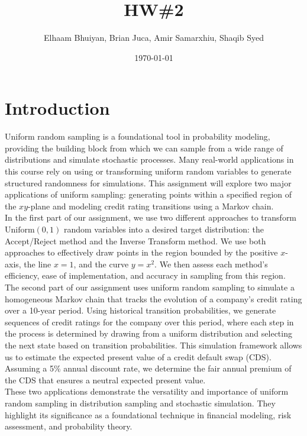 \documentclass{report}
\title{HW\#2}
\author{
Elhaam Bhuiyan,
Brian Juca,
Amir Samarxhiu,
Shaqib Syed
}
\date{\today}
\begin{document}
\maketitle
\section*{Introduction}
Uniform random sampling is a foundational tool in probability modeling, providing the building block from which we can sample from a wide range of distributions and simulate stochastic processes. Many real-world applications in this course rely on using or transforming uniform random variables to generate structured randomness for simulations. This assignment will explore two major applications of uniform sampling: generating points within a specified region of the $xy$-plane and modeling credit rating transitions using a Markov chain. \\

In the first part of our assignment, we use two different approaches to transform $\text{Uniform}(0, 1)$ random variables into a desired target distribution: the Accept/Reject method and the Inverse Transform method. We use both approaches to effectively draw points in the region bounded by the positive $x$-axis, the line $x = 1$, and the curve $y = x^2$. We then assess each method's efficiency, ease of implementation, and accuracy in sampling from this region. \\

The second part of our assignment uses uniform random sampling to simulate a homogeneous Markov chain that tracks the evolution of a company's credit rating over a 10-year period. Using historical transition probabilities, we generate sequences of credit ratings for the company over this period, where each step in the process is determined by drawing from a uniform distribution and selecting the next state based on transition probabilities. This simulation framework allows us to estimate the expected present value of a credit default swap (CDS). Assuming a 5\% annual discount rate, we determine the fair annual premium of the CDS that ensures a neutral expected present value. \\

These two applications demonstrate the versatility and importance of uniform random sampling in distribution sampling and stochastic simulation. They highlight its significance as a foundational technique in financial modeling, risk assessment, and probability theory.
\end{document}
